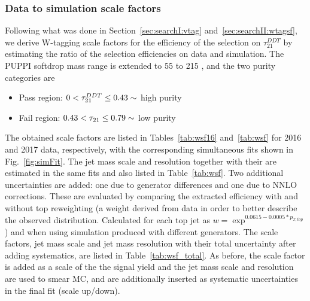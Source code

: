 \subsubsection{Data to simulation scale factors}
\label{sec:searchIII:wtagSF}
Following what was done in Section~\ref{sec:searchI:vtag} and~\ref{sec:searchII:wtagsf}, we derive W-tagging scale factors for the efficiency of the selection on $\tau_{21}^{DDT}$ by estimating the ratio of the selection efficiencies on data and simulation. The PUPPI softdrop mass range is extended to 55 to 215 \GeV, and the two purity categories are
\begin{itemize}
\itemsep0em
  \item Pass region: $0 <  \tau_{21}^{DDT} \leq 0.43 \sim$ high purity
  \item Fail region: $0.43 < \tau_{21} \leq 0.79 \sim$ low purity
\end{itemize}
The obtained scale factors are listed in Tables~\ref{tab:wsf16} and~\ref{tab:wsf} for 2016 and 2017 data, respectively, with the corresponding simultaneous fits shown in Fig.~\ref{fig:simFit}. 
The jet mass scale and resolution together with their are estimated in the same fits and also listed in Table~\ref{tab:wsf}. Two additional uncertainties are added: one due to generator differences and one due to NNLO corrections. These are evaluated by comparing the extracted efficiency with and without top \PT reweighting (a weight derived from data in order to better describe the observed \PT distribution. Calculated for each top jet as $w=\exp^{0.0615-0.0005*p_{T,top}}$) and when using \ttbar simulation produced with different generators. The scale factors, jet mass scale and jet mass resolution with their total uncertainty after adding systematics, are listed in Table~\ref{tab:wsf_total}. As before, the scale factor is added as a scale of the the signal yield and the jet mass scale and resolution are used to smear MC, and are additionally inserted as systematic uncertainties in the final fit (scale up/down).
